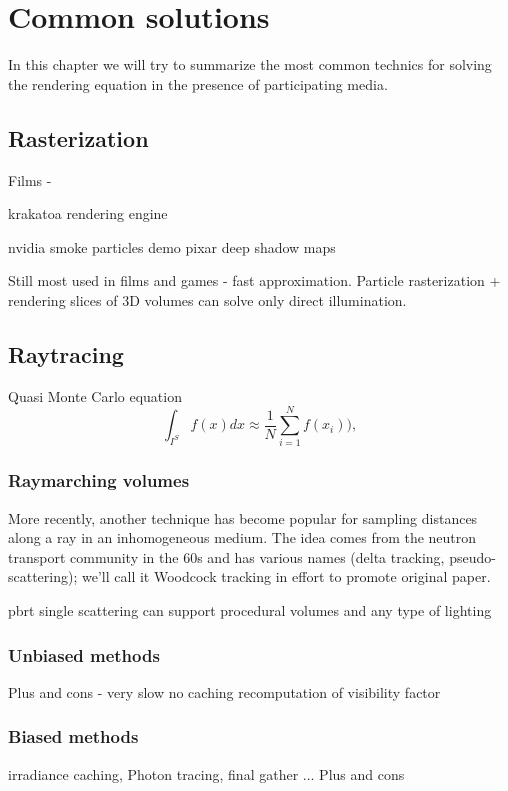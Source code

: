 \chapter{Common solutions}
In this chapter we will try to summarize the most common technics for solving the rendering equation in the presence of participating media.

\section{ Rasterization}
Films - 

krakatoa rendering engine

nvidia smoke particles demo 
pixar deep shadow maps \cite{LokDSM}

Still most used in films and games - fast approximation.
Particle rasterization + rendering slices of 3D volumes can solve only direct illumination.
\section{Raytracing}
Quasi Monte Carlo equation
\begin{equation*}
\int _{I^{S}}f(x)dx\approx\frac{1}{N}\sum_{i=1}^{N}f(x_{i})),
\end{equation*}
\subsection{Raymarching volumes}
More recently, another technique has become popular for sampling distances along a ray in an inhomogeneous medium. The idea comes from the neutron transport community in the 60s and has various names (delta tracking, pseudo-scattering); we’ll call it Woodcock tracking in effort to promote original paper.


pbrt single scattering
can support procedural volumes and any type of lighting
\subsection{Unbiased methods}
Plus and cons - very slow no caching recomputation of visibility factor
\subsection{Biased methods}
\cite{jarosz08thesis} %
irradiance caching, Photon tracing, final gather ...
Plus and cons

